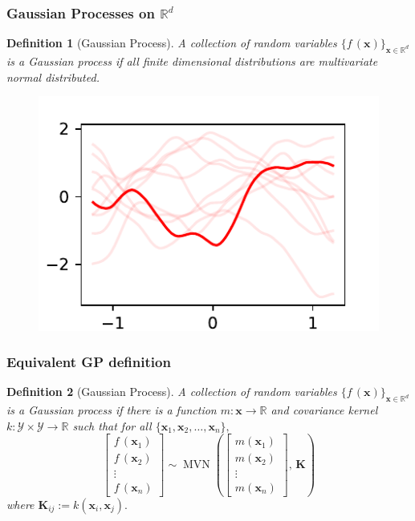 \documentclass{beamer}
\DeclareMathOperator{\MVN}{MVN}
\newcommand{\R}{\mathbb{R}}
\newtheorem{definnn}{Definition}
\begin{document}
\begin{frame}
    \frametitle{Gaussian Processes on $\R^d$}
    \begin{definnn}[Gaussian Process]
        A collection of random variables $\{f\,(\mathbf{x})\}_{\mathbf{x}\in\R^d}$
        is a \emph{Gaussian process} if all finite dimensional distributions are
        multivariate normal distributed.
    \end{definnn}
    \begin{figure}
        \centering
        \includegraphics{maternfivehalves_kernel.pdf}
    \end{figure}
\end{frame}

\begin{frame}
    \frametitle{Equivalent GP definition}
    \begin{definnn}[Gaussian Process]
        A collection of random variables $\{f\,(\mathbf{x})\}_{\mathbf{x}\in\R^d}$
        is a \emph{Gaussian process} if there is a function
        $m:\mathcal{\mathbf{x}}\to\R$ and covariance kernel
        $k:\mathcal{Y}\times\mathcal{Y}\to \R$
        such that for all $\{\mathbf{x}_1, \mathbf{x}_2, \dots, \mathbf{x}_n\},$
        $$\begin{bmatrix}
                f\,(\mathbf{x}_1) \\ f\,(\mathbf{x}_2)\\ \vdots\\ f\,(\mathbf{x}_n)
            \end{bmatrix} \sim
            \MVN\left(\begin{bmatrix}
                m(\mathbf{x}_1) \\ m(\mathbf{x}_2)\\ \vdots\\ m(\mathbf{x}_n)
            \end{bmatrix},\, \mathbf{K}\right)$$
        where $\mathbf{K}_{ij} := k(\mathbf{x}_i, \mathbf{x}_j).$
    \end{definnn}
\end{frame}
\end{document}
